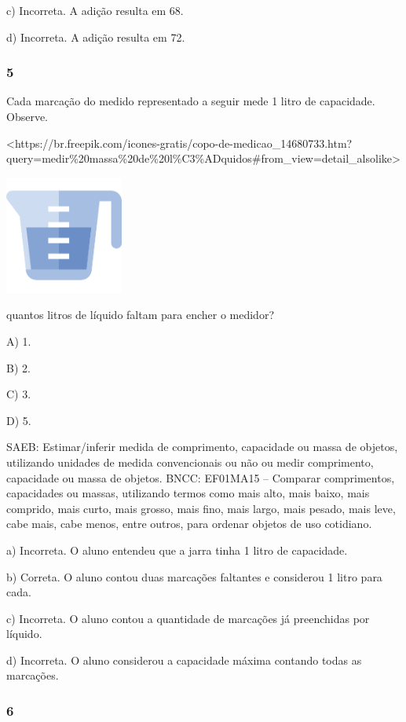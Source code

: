 c) Incorreta. A adição resulta em 68.

d) Incorreta. A adição resulta em 72.

\subsubsection{5}\label{section-106}

Cada marcação do medido representado a seguir mede 1 litro de capacidade. Observe.

\textless{}https://br.freepik.com/icones-gratis/copo-de-medicao\_14680733.htm?query=medir\%20massa\%20de\%20l\%C3\%ADquidos\#from\_view=detail\_alsolike\textgreater{}

\includegraphics[width=1.53125in,height=1.53125in]{media/image113.png}

quantos litros de líquido faltam para encher o medidor?

A) 1.

B) 2.

C) 3.

D) 5.

SAEB: Estimar/inferir medida de comprimento, capacidade ou massa
de objetos, utilizando unidades de medida convencionais ou não ou medir
comprimento, capacidade ou massa de objetos.
BNCC: EF01MA15 -- Comparar comprimentos, capacidades ou massas,
utilizando termos como mais alto, mais baixo, mais comprido, mais curto,
mais grosso, mais fino, mais largo, mais pesado, mais leve, cabe mais,
cabe menos, entre outros, para ordenar objetos de uso cotidiano.

a) Incorreta. O aluno entendeu que a jarra tinha 1 litro de capacidade.

b) Correta. O aluno contou duas marcações faltantes e considerou 1
litro para cada.

c) Incorreta. O aluno contou a quantidade de marcações já preenchidas
por líquido.

d) Incorreta. O aluno considerou a capacidade máxima contando todas as marcações.

\subsubsection{6}\label{section-107}

